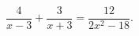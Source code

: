 \begin{ex}[type=equation]
	\begin{condition}
		$\dfrac{4}{x - 3} + \dfrac{3}{x + 3} = \dfrac{12}{2x^2 - 18}.$
	\end{condition}
\end{ex}
